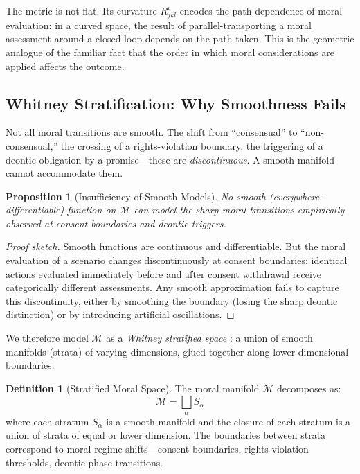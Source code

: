 \documentclass[12pt]{article}
\newtheorem{proposition}[theorem]{Proposition}
\theoremstyle{definition}
\newtheorem{definition}[theorem]{Definition}
\theoremstyle{remark}
\newcommand{\M}{\mathcal{M}}
\begin{document}
The metric is not flat. Its curvature $R^i_{jkl}$ encodes the path-dependence of moral evaluation: in a curved space, the result of parallel-transporting a moral assessment around a closed loop depends on the path taken. This is the geometric analogue of the familiar fact that the order in which moral considerations are applied affects the outcome.

\subsection{Whitney Stratification: Why Smoothness Fails}

Not all moral transitions are smooth. The shift from ``consensual'' to ``non-consensual,'' the crossing of a rights-violation boundary, the triggering of a deontic obligation by a promise---these are \emph{discontinuous}. A smooth manifold cannot accommodate them.

\begin{proposition}[Insufficiency of Smooth Models]
\label{prop:smooth_insufficient}
No smooth (everywhere-differentiable) function on $\M$ can model the sharp moral transitions empirically observed at consent boundaries and deontic triggers.
\end{proposition}

\begin{proof}[Proof sketch]
Smooth functions are continuous and differentiable. But the moral evaluation of a scenario changes discontinuously at consent boundaries: identical actions evaluated immediately before and after consent withdrawal receive categorically different assessments. Any smooth approximation fails to capture this discontinuity, either by smoothing the boundary (losing the sharp deontic distinction) or by introducing artificial oscillations.
\end{proof}

We therefore model $\M$ as a \emph{Whitney stratified space} \citep{whitney1965}: a union of smooth manifolds (strata) of varying dimensions, glued together along lower-dimensional boundaries.

\begin{definition}[Stratified Moral Space]
The moral manifold $\M$ decomposes as:
\begin{equation}
\M = \bigsqcup_{\alpha} S_\alpha
\label{eq:strat}
\end{equation}
where each stratum $S_\alpha$ is a smooth manifold and the closure of each stratum is a union of strata of equal or lower dimension. The boundaries between strata correspond to moral regime shifts---consent boundaries, rights-violation thresholds, deontic phase transitions.
\end{definition}
\end{document}
